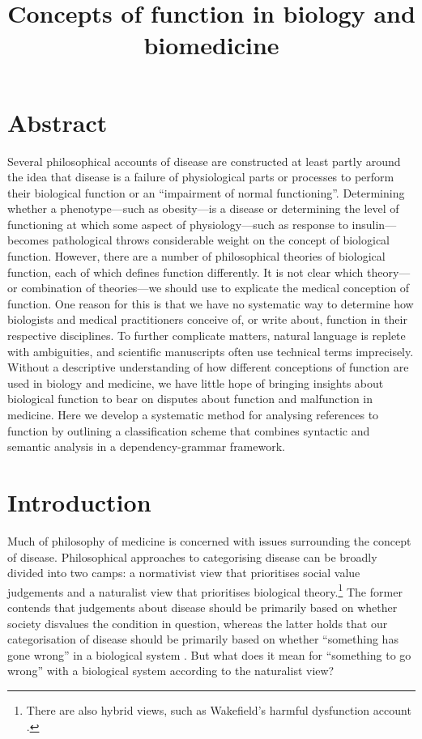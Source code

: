 \documentclass{article}
\title{Concepts of function in biology and biomedicine}
\begin{document}
\maketitle

\section{Abstract}
\label{sec:abstract}

Several philosophical accounts of disease are constructed at least partly around the idea that disease is a failure of physiological parts or processes to perform their biological function or an ``impairment of normal functioning''. Determining whether a phenotype—such as obesity—is a disease or determining the level of functioning at which some aspect of physiology—such as response to insulin—becomes pathological throws considerable weight on the concept of biological function. However, there are a number of philosophical theories of biological function, each of which defines function differently. It is not clear which theory—or combination of theories—we should use to explicate the medical conception of function. One reason for this is that we have no systematic way to determine how biologists and medical practitioners conceive of, or write about, function in their respective disciplines. To further complicate matters, natural language is replete with ambiguities, and scientific manuscripts often use technical terms imprecisely. Without a descriptive understanding of how different conceptions of function are used in biology and medicine, we have little hope of bringing insights about biological function to bear on disputes about function and malfunction in medicine. Here we develop a systematic method for analysing references to function by outlining a classification scheme that combines syntactic and semantic analysis in a dependency-grammar framework.

\section{Introduction}
\label{sec:introduction}

Much of philosophy of medicine is concerned with issues surrounding the concept of disease.
Philosophical approaches to categorising disease can be broadly divided into two camps: a normativist view that prioritises social value judgements and a naturalist view that prioritises biological theory.\footnote{There are also hybrid views, such as Wakefield's harmful dysfunction account \cite{wakefield1992}. }
The former contends that judgements about disease should be primarily based on whether society disvalues the condition in question, whereas the latter holds that our categorisation of disease should be primarily based on whether ``something has gone wrong'' in a biological system \cite{matthewson2017} .
But what does it mean for ``something to go wrong'' with a biological system according to the naturalist view?
\end{document}
